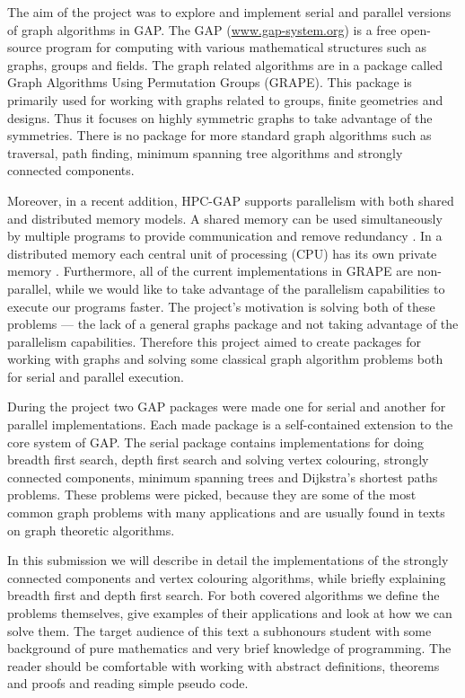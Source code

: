 \documentclass{report}
\theoremstyle{plain}
\theoremstyle{definition}
\theoremstyle{remark}
\numberwithin{definition}{chapter}
\numberwithin{example}{chapter}
\numberwithin{figure}{chapter}
\numberwithin{theorem}{chapter}
\numberwithin{lemma}{chapter}
\begin{document}
The aim of the project was to explore and implement serial and parallel versions of graph algorithms in GAP. The GAP (\url{www.gap-system.org}) is a free open-source program for computing with various mathematical structures such as graphs, groups and fields. The graph related algorithms are in a package called Graph Algorithms Using Permutation Groups (GRAPE). This package is primarily used for working with graphs related to groups, finite geometries and designs. Thus it focuses on highly symmetric graphs to take advantage of the symmetries. There is no package for more standard graph algorithms such as traversal, path finding, minimum spanning tree algorithms and strongly connected components.

Moreover, in a recent addition, HPC-GAP supports parallelism with both shared and distributed memory models. A shared memory can be used simultaneously by multiple programs to provide communication and remove redundancy \cite{berman1996fundamentals}. In a distributed memory each central unit of processing (CPU) has its own private memory \cite{berman1996fundamentals}. Furthermore, all of the current implementations in GRAPE are non-parallel, while we would like to take advantage of the parallelism capabilities to execute our programs faster. The project's motivation is solving both of these problems --- the lack of a general graphs package and not taking advantage of the parallelism capabilities. Therefore this project aimed to create packages for working with graphs and solving some classical graph algorithm problems both for serial and parallel execution.

During the project two GAP packages were made one for serial and another for parallel implementations. Each made package is a self-contained extension to the core system of GAP. The serial package contains implementations for doing breadth first search, depth first search and solving vertex colouring, strongly connected components, minimum spanning trees and Dijkstra's shortest paths problems. These problems were picked, because they are some of the most common graph problems with many applications and are usually found in texts on graph theoretic algorithms.

In this submission we will describe in detail the implementations of the strongly connected components and vertex colouring algorithms, while briefly explaining breadth first and depth first search. For both covered algorithms we define the problems themselves, give examples of their applications and look at how we can solve them. The target audience of this text a subhonours student with some background of pure mathematics and very brief knowledge of programming. The reader should be comfortable with working with abstract definitions, theorems and proofs and reading simple pseudo code.
\end{document}
